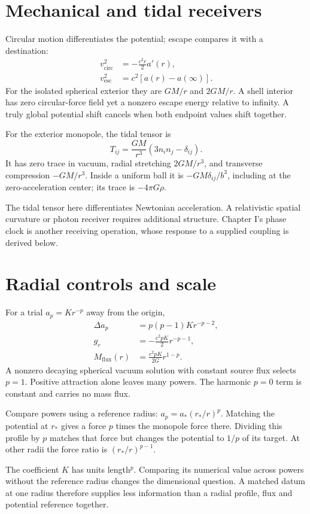 \documentclass[10pt,twocolumn,letterpaper]{article}
\begin{document}
\section{Mechanical and tidal receivers}
Circular motion differentiates the potential; escape compares it with a destination:
\[
\begin{aligned}
v_{\mathrm{circ}}^2&=-\frac{c^2r}{2}a'(r),\\
v_{\mathrm{esc}}^2&=c^2[a(r)-a(\infty)].
\end{aligned}
\]
For the isolated spherical exterior they are $GM/r$ and $2GM/r$. A shell interior has zero circular-force field yet a nonzero escape energy relative to infinity. A truly global potential shift cancels when both endpoint values shift together.

For the exterior monopole, the tidal tensor is
\[
T_{ij}=\frac{GM}{r^3}(3n_i n_j-\delta_{ij}).
\]
It has zero trace in vacuum, radial stretching $2GM/r^3$, and transverse compression $-GM/r^3$. Inside a uniform ball it is $-GM\delta_{ij}/b^3$, including at the zero-acceleration center; its trace is $-4\pi G\rho$.

The tidal tensor here differentiates Newtonian acceleration. A relativistic spatial curvature or photon receiver requires additional structure. Chapter I's phase clock is another receiving operation, whose response to a supplied coupling is derived below.

\section{Radial controls and scale}
For a trial $a_p=Kr^{-p}$ away from the origin,
\[
\begin{aligned}
\Delta a_p&=p(p-1)Kr^{-p-2},\\
g_r&=-\frac{c^2pK}{2}r^{-p-1},\\
M_{\mathrm{flux}}(r)&=\frac{c^2pK}{2G}r^{1-p}.
\end{aligned}
\]
A nonzero decaying spherical vacuum solution with constant source flux selects $p=1$. Positive attraction alone leaves many powers. The harmonic $p=0$ term is constant and carries no mass flux.

Compare powers using a reference radius: $a_p=a_*(r_*/r)^p$. Matching the potential at $r_*$ gives a force $p$ times the monopole force there. Dividing this profile by $p$ matches that force but changes the potential to $1/p$ of its target. At other radii the force ratio is $(r_*/r)^{p-1}$.

The coefficient $K$ has units length$^p$. Comparing its numerical value across powers without the reference radius changes the dimensional question. A matched datum at one radius therefore supplies less information than a radial profile, flux and potential reference together.
\end{document}
